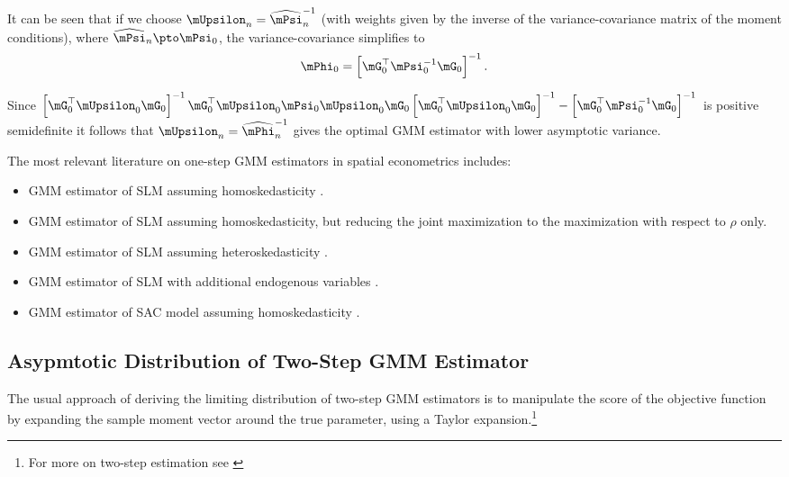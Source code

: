 \documentclass[english,12pt]{book}\usepackage[]{graphicx}\usepackage[]{xcolor}
\begin{document}
It can be seen that if we choose $\mUpsilon_n = \widehat{\mPsi}^{-1}_n$ (with weights given by the inverse of the variance-covariance matrix of the moment conditions), where $\widehat{\mPsi}_n\pto \mPsi_0$, the variance-covariance simplifies to
\begin{equation*}
\mPhi_0 = \left[\mG^\top_0\mPsi^{-1}_0\mG_0\right]^{-1}.
\end{equation*}

Since $\left[\mG^\top_0\mUpsilon_0\mG_0\right]^{-1}\mG^\top_0\mUpsilon_0\mPsi_0\mUpsilon_0\mG_0\left[\mG^\top_0\mUpsilon_0\mG_0\right]^{-1} - \left[\mG^\top_0\mPsi^{-1}_0\mG_0\right]^{-1}$ is positive semidefinite it follows that $\mUpsilon_n= \widehat{\mPhi}^{-1}_n$ gives the optimal GMM estimator with lower asymptotic variance. 

The most relevant literature on one-step GMM estimators in spatial econometrics includes:
\begin{itemize}
  \item GMM estimator of SLM assuming homoskedasticity \citep{lee2007gmm}.
  \item GMM estimator of SLM assuming homoskedasticity, but reducing the joint maximization to the maximization with respect to $\rho$ only. 
  \item GMM estimator of SLM assuming heteroskedasticity \citep{lin2010gmm}. 
  \item GMM estimator of SLM with additional endogenous variables \citep{liu2015gmm}.
  \item GMM estimator of SAC model assuming homoskedasticity \citep{lee2010efficient, liu2010efficient}.
\end{itemize}

\subsection{Asypmtotic Distribution of Two-Step GMM Estimator}\label{section:2step-gmm}

The usual approach of deriving the limiting distribution of two-step GMM estimators is to manipulate the score of the objective function by expanding the sample moment vector around the true parameter, using a Taylor expansion.\footnote{For more on two-step estimation see \citet[][section 6]{newey1994large}}
\end{document}
